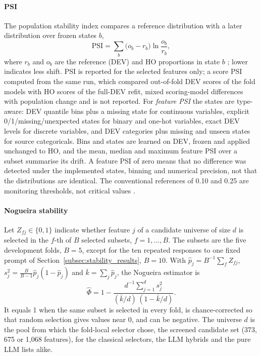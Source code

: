 \documentclass[final,5p,twocolumn]{elsarticle}
\newcommand{\PSI}{\mathrm{PSI}}
\begin{document}
\paragraph{PSI}
The population stability index compares a reference distribution with a later distribution over frozen states $b$,
\begin{equation}
    \PSI=\sum_{b}\big(o_b-r_b\big)\ln\frac{o_b}{r_b},
    \label{eq:psi}
\end{equation}
where $r_b$ and $o_b$ are the reference (DEV) and HO proportions in state $b$ \cite{siddiqi2006,yurdakul2020}; lower indicates less shift. PSI is reported for the selected features only; a score PSI computed from the same run, which compared out-of-fold DEV scores of the fold models with HO scores of the full-DEV refit, mixed scoring-model differences with population change and is not reported. For \emph{feature PSI} the states are type-aware: DEV quantile bins plus a missing state for continuous variables, explicit 0/1/missing/unexpected states for binary and one-hot variables, exact DEV levels for discrete variables, and DEV categories plus missing and unseen states for source categoricals. Bins and states are learned on DEV, frozen and applied unchanged to HO, and the mean, median and maximum feature PSI over a subset summarise its drift. A feature PSI of zero means that no difference was detected under the implemented states, binning and numerical precision, not that the distributions are identical. The conventional references of 0.10 and 0.25 are monitoring thresholds, not critical values \cite{yurdakul2020}.

\paragraph{Nogueira stability}
Let $Z_{fj}\in\{0,1\}$ indicate whether feature $j$ of a candidate universe of size $d$ is selected in the $f$-th of $B$ selected subsets, $f=1,\dots,B$. The subsets are the five development folds, $B=5$, except for the ten repeated responses to one fixed prompt of Section~\ref{subsec:stability_results}, $B=10$. With $\hat p_j=B^{-1}\sum_f Z_{fj}$, $s_j^2=\frac{B}{B-1}\hat p_j(1-\hat p_j)$ and $\bar k=\sum_j \hat p_j$, the Nogueira estimator is \cite{nogueira2018}
\begin{equation}
    \hat\Phi=1-\frac{d^{-1}\sum_{j=1}^{d}s_j^2}{(\bar k/d)\,(1-\bar k/d)} .
    \label{eq:nogueira}
\end{equation}
It equals 1 when the same subset is selected in every fold, is chance-corrected so that random selection gives values near 0, and can be negative. The universe $d$ is the pool from which the fold-local selector chose, the screened candidate set (373, 675 or 1,068 features), for the classical selectors, the LLM hybrids and the pure LLM lists alike.
\end{document}
